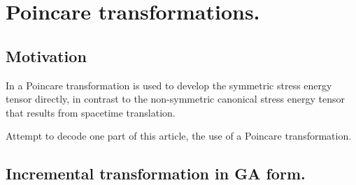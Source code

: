 
%
%
%

\newcommand{\boxedeqn}[1]{%
  \[\fbox{%
      \addtolength{\linewidth}{-2\fboxsep}%
      \addtolength{\linewidth}{-2\fboxrule}%
      \begin{minipage}{\linewidth}%
      \begin{equation}#1\end{equation}%
      \end{minipage}%
    }\]%
}



\chapter{Poincare transformations.}

%

\section{Motivation}

In \cite{montesinos2006sem} a Poincare transformation is used to 
develop the symmetric stress energy tensor directly, in contrast to the
non-symmetric canonical stress energy tensor that results from 
spacetime translation.

Attempt to decode one part of this article, the use of a Poincare transformation.

\section{Incremental transformation in GA form.}

